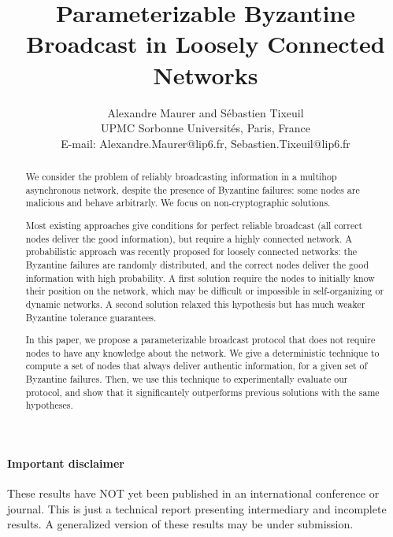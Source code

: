 \documentclass[a4paper,11pt]{article}
\begin{document}
\newtheorem{theorem}{Theorem}
\newtheorem{lemma}{Lemma}
\newtheorem{definition}{Definition}

\title{Parameterizable Byzantine Broadcast in Loosely Connected Networks}
\author{Alexandre Maurer and S\'{e}bastien Tixeuil\\
UPMC Sorbonne Universit\'{e}s, Paris, France\\
E-mail: Alexandre.Maurer@lip6.fr, Sebastien.Tixeuil@lip6.fr\\
}

\maketitle


\begin{abstract}
We consider the problem of reliably broadcasting information in a multihop asynchronous network, despite the presence of Byzantine failures: some nodes are malicious and behave arbitrarly. We focus on non-cryptographic solutions.

Most existing approaches give conditions for perfect reliable broadcast (all correct nodes deliver the good information), but require a highly connected network. A probabilistic approach was recently proposed for loosely connected networks: the Byzantine failures are randomly distributed, and the correct nodes deliver the good information with high probability. A first solution require the nodes to initially know their position on the network, which may be difficult or impossible in self-organizing or dynamic networks. A second solution relaxed this hypothesis but has much weaker Byzantine tolerance guarantees.

In this paper, we propose a parameterizable broadcast protocol that does not require nodes to have any knowledge about the network. We give a deterministic technique to compute a set of nodes that always deliver authentic information, for a given set of Byzantine failures. Then, we use this technique to experimentally evaluate our protocol, and show that it significantely outperforms previous solutions with the same hypotheses.
\end{abstract}





\vspace{5mm}

\paragraph{Important disclaimer}  These results have NOT yet been published in an international conference or journal. This is just a technical report presenting intermediary and incomplete results. A generalized version of these results may be under submission.
\end{document}
